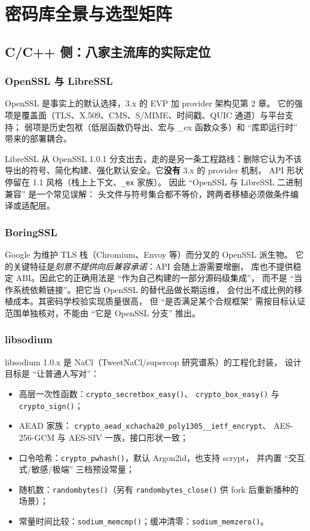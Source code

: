 \documentclass[12pt,a4paper,fontset=fandol]{ctexbook}
\newcommand{\Fn}[1]{\texttt{#1()}}
\newcommand{\Tp}[1]{\texttt{#1}}
\newcommand{\CppJava}{C/C++}
\begin{document}
\chapter{密码库全景与选型矩阵}

\section{\CppJava{} 侧：八家主流库的实际定位}

\subsection{OpenSSL 与 LibreSSL}

OpenSSL 是事实上的默认选择，3.x 的 EVP 加 provider 架构见第 2 章。
它的强项是覆盖面（TLS、X.509、CMS、S/MIME、时间戳、QUIC 通道）与平台支持；
弱项是历史包袱（低层函数仍导出、宏与 \_ex 函数众多）和
``库即运行时'' 带来的部署耦合。

LibreSSL 从 OpenSSL 1.0.1 分支出去，走的是另一条工程路线：删除它认为不该
导出的符号、简化构建、强化默认安全。它\textbf{没有} 3.x 的 provider 机制，
API 形状停留在 1.1 风格（栈上上下文、\texttt{\_ex} 家族）。
因此 ``OpenSSL 与 LibreSSL 二进制兼容'' 是一个常见误解：
头文件与符号集合都不等价，跨两者移植必须做条件编译或适配层。

\subsection{BoringSSL}

Google 为维护 TLS 栈（Chromium、Envoy 等）而分叉的 OpenSSL 派生物。
它的关键特征是\emph{刻意不提供向后兼容承诺}：API 会随上游需要增删，
库也不提供稳定 ABI。因此它的正确用法是 ``作为自己构建的一部分源码级集成''，
而不是 ``当作系统依赖链接''。把它当 OpenSSL 的替代品做长期运维，
会付出不成比例的移植成本。其密码学校验实现质量很高，
但 ``是否满足某个合规框架'' 需按目标认证范围单独核对，不能由 ``它是 OpenSSL 分支''
推出。

\subsection{libsodium}

libsodium 1.0.x 是 NaCl（TweetNaCl/supercop 研究谱系）的工程化封装，
设计目标是 ``让普通人写对''：

\begin{itemize}
  \item 高层一次性函数：\Fn{crypto\_secretbox\_easy}、
        \Fn{crypto\_box\_easy} 与 \Fn{crypto\_sign}；
  \item AEAD 家族：
        \Tp{crypto\_aead\_xchacha20\_\allowbreak poly1305\_\allowbreak\_ietf\_encrypt}、
        AES-256-GCM 与 AES-SIV 一族，接口形状一致；
  \item 口令哈希：\Fn{crypto\_pwhash}，默认 Argon2id，也支持 scrypt，
        并内置 ``交互式/敏感/极端'' 三档预设常量；
  \item 随机数：\Fn{randombytes}（另有
        \Fn{randombytes\_close} 供 fork 后重新播种的场景）；
  \item 常量时间比较：\Fn{sodium\_memcmp}；缓冲清零：\Fn{sodium\_memzero}。
\end{itemize}
\end{document}
